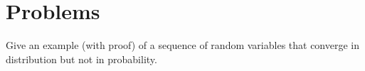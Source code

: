 %	
%

\section{Problems}

\begin{problem}\label{prb:dlim_not_plim}
Give an example (with proof) of a sequence of random variables that converge in distribution but not in probability.
\end{problem}



